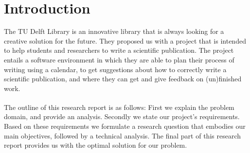 \section{Introduction}
The TU Delft Library is an innovative library that is always looking for a creative solution for the future. They proposed us with a project that is intended to help students and researchers to write a scientific publication. The project entails a software environment in which they are able to plan their process of writing using a calendar, to get suggestions about how to correctly write a scientific publication, and where they can get and give feedback on (un)finished work.\\\\
The outline of this research report is as follows: First we explain the problem domain, and provide an analysis. Secondly we state our project's requirements. Based on these requirements we formulate a research question that embodies our main objectives, followed by a technical analysis. The final part of this research report provides us with the optimal solution for our problem.